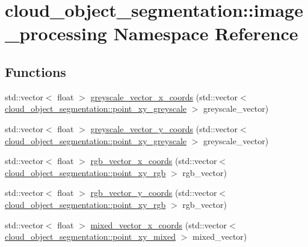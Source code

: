 \hypertarget{namespacecloud__object__segmentation_1_1image__processing}{}\section{cloud\+\_\+object\+\_\+segmentation\+:\+:image\+\_\+processing Namespace Reference}
\label{namespacecloud__object__segmentation_1_1image__processing}
\subsection*{Functions}
\begin{DoxyCompactItemize}
\item 
std\+::vector$<$ float $>$ \hyperlink{namespacecloud__object__segmentation_1_1image__processing_adefb23b1c6adeb7083d9c544a81a4a61}{greyscale\+\_\+vector\+\_\+x\+\_\+coords} (std\+::vector$<$ \hyperlink{classcloud__object__segmentation_1_1point__xy__greyscale}{cloud\+\_\+object\+\_\+segmentation\+::point\+\_\+xy\+\_\+greyscale} $>$ greyscale\+\_\+vector)
\item 
std\+::vector$<$ float $>$ \hyperlink{namespacecloud__object__segmentation_1_1image__processing_a28e434caf24705b6ba2635a4e52410f3}{greyscale\+\_\+vector\+\_\+y\+\_\+coords} (std\+::vector$<$ \hyperlink{classcloud__object__segmentation_1_1point__xy__greyscale}{cloud\+\_\+object\+\_\+segmentation\+::point\+\_\+xy\+\_\+greyscale} $>$ greyscale\+\_\+vector)
\item 
std\+::vector$<$ float $>$ \hyperlink{namespacecloud__object__segmentation_1_1image__processing_a0011364a123ed053792faf6f5dd4560d}{rgb\+\_\+vector\+\_\+x\+\_\+coords} (std\+::vector$<$ \hyperlink{classcloud__object__segmentation_1_1point__xy__rgb}{cloud\+\_\+object\+\_\+segmentation\+::point\+\_\+xy\+\_\+rgb} $>$ rgb\+\_\+vector)
\item 
std\+::vector$<$ float $>$ \hyperlink{namespacecloud__object__segmentation_1_1image__processing_aad9e2e2d36f61f144c492643239ad76c}{rgb\+\_\+vector\+\_\+y\+\_\+coords} (std\+::vector$<$ \hyperlink{classcloud__object__segmentation_1_1point__xy__rgb}{cloud\+\_\+object\+\_\+segmentation\+::point\+\_\+xy\+\_\+rgb} $>$ rgb\+\_\+vector)
\item 
std\+::vector$<$ float $>$ \hyperlink{namespacecloud__object__segmentation_1_1image__processing_a670a09eeefa55b4fd5d845bde8779ed8}{mixed\+\_\+vector\+\_\+x\+\_\+coords} (std\+::vector$<$ \hyperlink{classcloud__object__segmentation_1_1point__xy__mixed}{cloud\+\_\+object\+\_\+segmentation\+::point\+\_\+xy\+\_\+mixed} $>$ mixed\+\_\+vector)

\end{DoxyCompactItemize}
